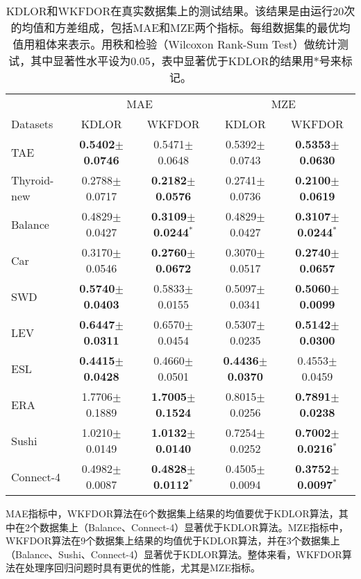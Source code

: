 \begin{table*}[!h]
\caption{KDLOR和WKFDOR在真实数据集上的测试结果。该结果是由运行20次的均值和方差组成，包括MAE和MZE两个指标。每组数据集的最优均值用粗体来表示。用秩和检验（Wilcoxon Rank-Sum Test）做统计测试，其中显著性水平设为0.05，表中显著优于KDLOR的结果用$*$号来标记。}
\label{table_realResults20m}
\centering
\begin{tabular}{l|cc|cc}
\toprule
 & \multicolumn {2}{c|}{MAE} & \multicolumn {2}{c}{MZE} \\
 \cmidrule {2-5}
Datasets & KDLOR & WKFDOR & KDLOR & WKFDOR\\
\midrule
TAE &  {\bf 0.5402$\pm$0.0746} &  0.5471$\pm$0.0648 & 0.5392$\pm$0.0743 & {\bf 0.5353$\pm$0.0630} \\
Thyroid-new & 0.2788$\pm$0.0717 &  {\bf 0.2182$\pm$0.0576} & 0.2741$\pm$0.0736 & {\bf 0.2100$\pm$0.0619} \\
Balance & 0.4829$\pm$0.0427 &  {\bf 0.3109$\pm$0.0244}$^{*}$ & 0.4829$\pm$0.0427 & {\bf 0.3107$\pm$0.0244}$^{*}$ \\
Car & 0.3170$\pm$0.0546 &  {\bf 0.2760$\pm$0.0672} & 0.3070$\pm$0.0517 & {\bf 0.2740$\pm$0.0657} \\
SWD & {\bf 0.5740$\pm$0.0403} &  0.5833$\pm$0.0155 & 0.5097$\pm$0.0341 & {\bf 0.5060$\pm$0.0099} \\
LEV & {\bf 0.6447$\pm$0.0311} &  0.6570$\pm$0.0454 & 0.5307$\pm$0.0235 & {\bf 0.5142$\pm$0.0300} \\
ESL & {\bf 0.4415$\pm$0.0428} &  0.4660$\pm$0.0501 & {\bf 0.4436$\pm$0.0370} & 0.4553$\pm$0.0459 \\
ERA & 1.7706$\pm$0.1889 &  {\bf 1.7005$\pm$0.1524} & 0.8015$\pm$0.0256 & {\bf 0.7891$\pm$0.0238} \\
Sushi & 1.0210$\pm$0.0149 & {\bf 1.0132$\pm$0.0140} & 0.7254$\pm$0.0252 & {\bf 0.7002$\pm$0.0216}$^{*}$ \\
Connect-4 & 0.4982$\pm$0.0087 & {\bf 0.4828$\pm$0.0112}$^{*}$ & 0.4505$\pm$0.0094 & {\bf 0.3752$\pm$0.0097}$^{*}$ \\
\bottomrule
\end{tabular}
\end{table*}

MAE指标中，WKFDOR算法在6个数据集上结果的均值要优于KDLOR算法，其中在2个数据集上（Balance、Connect-4）显著优于KDLOR算法。MZE指标中，WKFDOR算法在9个数据集上结果的均值优于KDLOR算法，并在3个数据集上（Balance、Sushi、Connect-4）显著优于KDLOR算法。整体来看，WKFDOR算法在处理序回归问题时具有更优的性能，尤其是MZE指标。

